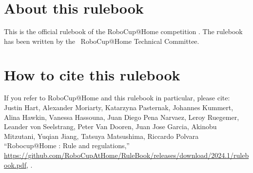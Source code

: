 
\section*{About this rulebook}
This is the official rulebook of the RoboCup@Home competition \YEAR. 
The rulebook has been written by the \YEAR ~RoboCup@Home Technical Committee.

\section*{How to cite this rulebook}
If you refer to RoboCup@Home and this rulebook in particular, please cite:\\

\noindent Justin Hart, Alexander Moriarty, Katarzyna Pasternak, Johannes Kummert,
Alina Hawkin, Vanessa Hassouna, Juan Diego Pena Narvaez, Leroy Ruegemer,
Leander von Seelstrang, Peter Van Dooren, Juan Jose Garcia, Akinobu Mitzutani,
Yuqian Jiang, Tatsuya Matsushima, Riccardo Polvara
\enquote{Robocup@Home \YEAR: Rule and regulations,}
\url{https://github.com/RoboCupAtHome/RuleBook/releases/download/2024.1/rulebook.pdf}, \YEAR.

\begin{center}
	\begin{minipage}{0.8\textwidth}
		\footnotesize%
		
	\end{minipage}
\end{center}

\pagebreak